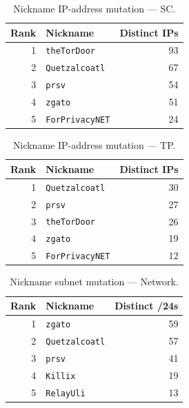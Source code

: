 \documentclass[conference]{IEEEtran}
\begin{document}
\begin{table}[H]
\caption{Nickname IP-address mutation --- SC.}
\begin{center}\small
\begin{tabular}{|r|l|r|}
\hline
\textbf{Rank} & \textbf{Nickname} & \textbf{Distinct IPs} \\ \hline
1 & \texttt{theTorDoor} & 93 \\ \hline
2 & \texttt{Quetzalcoatl} & 67 \\ \hline
3 & \texttt{prsv} & 54 \\ \hline
4 & \texttt{zgato} & 51 \\ \hline
5 & \texttt{ForPrivacyNET} & 24 \\ \hline
\end{tabular}
\label{tab:ipchg_static_control}
\end{center}\end{table}
 
\begin{table}[H]
\caption{Nickname IP-address mutation --- TP.}
\begin{center}\small
\begin{tabular}{|r|l|r|}
\hline
\textbf{Rank} & \textbf{Nickname} & \textbf{Distinct IPs} \\ \hline
1 & \texttt{Quetzalcoatl} & 30 \\ \hline
2 & \texttt{prsv} & 27 \\ \hline
3 & \texttt{theTorDoor} & 26 \\ \hline
4 & \texttt{zgato} & 19 \\ \hline
5 & \texttt{ForPrivacyNET} & 12 \\ \hline
\end{tabular}
\label{tab:ipchg_third_party_probe}
\end{center}\end{table}
 
\begin{table}[H]
\caption{Nickname subnet mutation --- Network.}
\begin{center}\small
\begin{tabular}{|r|l|r|}
\hline
\textbf{Rank} & \textbf{Nickname} & \textbf{Distinct /24s} \\ \hline
1 & \texttt{zgato} & 59 \\ \hline
2 & \texttt{Quetzalcoatl} & 57 \\ \hline
3 & \texttt{prsv} & 41 \\ \hline
4 & \texttt{Killix} & 19 \\ \hline
5 & \texttt{RelayUli} & 13 \\ \hline
\end{tabular}
\label{tab:subnetchg_network}
\end{center}\end{table}
 
\end{document}
